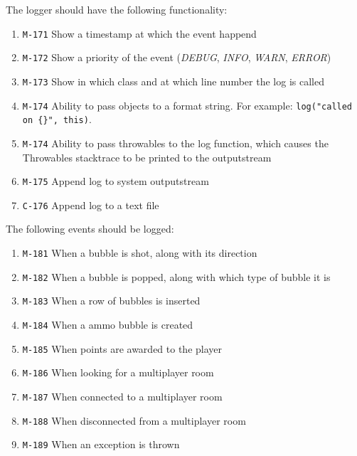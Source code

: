 \documentclass[a4paper]{article}
\begin{document}
\begin{itemize}
  The logger should have the following functionality:
       \begin{enumerate}
          \item \texttt{M-171} Show a timestamp at which the event happend
          \item \texttt{M-172} Show a priority of the event (\textit{DEBUG}, \textit{INFO}, \textit{WARN}, \textit{ERROR})
          \item \texttt{M-173} Show in which class and at which line number the log is called
          \item \texttt{M-174} Ability to pass objects to a format string. For example: \texttt{log("called on \{\}", this)}.
          \item \texttt{M-174} Ability to pass throwables to the log function, which causes
          the Throwables stacktrace to be printed to the outputstream
          \item \texttt{M-175} Append log to system outputstream
          \item \texttt{C-176} Append log to a text file
      \end{enumerate} 
  
  	The following events should be logged:
  
        \begin{enumerate}
          \item \texttt{M-181} When a bubble is shot, along with its direction
          \item \texttt{M-182} When a bubble is popped, along with which type of bubble it is
          \item \texttt{M-183} When a row of bubbles is inserted
          \item \texttt{M-184} When a ammo bubble is created
          \item \texttt{M-185} When points are awarded to the player
          \item \texttt{M-186} When looking for a multiplayer room
          \item \texttt{M-187} When connected to a multiplayer room
          \item \texttt{M-188} When disconnected from a multiplayer room
          \item \texttt{M-189} When an exception is thrown
      \end{enumerate}
      

\end{itemize}
\end{document}
